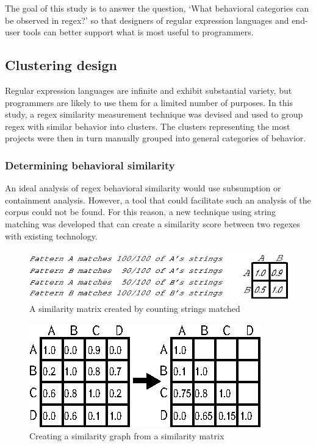 The goal of this study is to answer the question, `What behavioral categories can be observed in regex?' so that designers of regular expression languages and end-user tools can better support what is most useful to programmers.

\subsection{Clustering design}
\label{sec:clusteringDesign}

Regular expression languages are infinite and exhibit substantial variety, but programmers are likely to use them for a limited number of purposes.  In this study, a regex similarity measurement technique was devised and used to group regex with similar behavior into clusters.  The clusters representing the most projects were then in turn manually grouped into general categories of behavior.

\subsubsection{Determining behavioral similarity}
An ideal analysis of regex behavioral similarity would use subsumption or containment analysis. However, a tool that could facilitate such an analysis of the corpus could not be found.  For this reason, a new technique using string matching was developed that can create a similarity score between two regexes with existing technology.

\begin{figure}[tb]
\centering
\includegraphics[height=0.85in]{nontex/illustrations/minimalMatrix.eps}
\caption{A similarity matrix created by counting strings matched}
\label{fig:minimalMatrix}
\end{figure}

\begin{figure}[tb]
\centering
\includegraphics[width=0.5\columnwidth]{nontex/illustrations/matrixToGraph.eps}
\vspace{-6pt}
\caption{Creating a similarity graph from a similarity matrix}
\vspace{-6pt}
\label{fig:matrixToGraph}
\end{figure}



